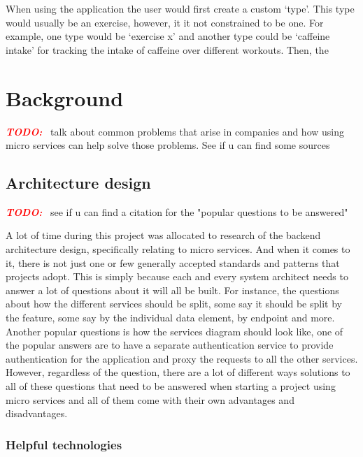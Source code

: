 \documentclass{article}
\newcommand{\vspaceconst}{-2ex}
\newcommand{\TODO}{\textbf{\textit{\textcolor{red}{TODO:}}} }
\begin{document}
\begin{multicols}{2}
When using the application the user would first create a custom `type'. This type would usually be an exercise, however, it it not constrained to be one. For example, one type would be `exercise x' and another type could be `caffeine intake' for tracking the intake of caffeine over different workouts. Then, the 

\section{Background}
\vspace{\vspaceconst}

\TODO~talk about common problems that arise in companies and how using micro services can help solve those problems. See if u can find some sources

\subsection{Architecture design}
\TODO~see if u can find a citation for the "popular questions to be answered" 

A lot of time during this project was allocated to research of the backend architecture design, specifically relating to micro services. And when it comes to it, there is not just one or few generally accepted standards and patterns that projects adopt. This is simply because each and every system architect needs to answer a lot of questions about it will all be built.
 For instance, the questions about how the different services should be split, some say it should be split by the feature, some say by the individual data element, by endpoint and more. Another popular questions is how the services diagram should look like, one of the popular answers are to have a separate authentication service to provide authentication for the application and proxy the requests to all the other services. However, regardless of the question, there are a lot of different ways solutions to all of these questions that need to be answered when starting a project using micro services and all of them come with their own advantages and disadvantages. 

\subsubsection{Helpful technologies}


\end{multicols}
\end{document}
